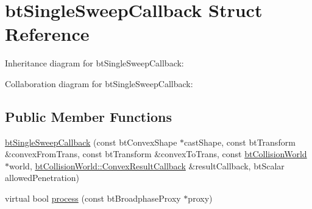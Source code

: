 \hypertarget{structbt_single_sweep_callback}{\section{bt\+Single\+Sweep\+Callback Struct Reference}
\label{structbt_single_sweep_callback}
}


Inheritance diagram for bt\+Single\+Sweep\+Callback\+:


Collaboration diagram for bt\+Single\+Sweep\+Callback\+:
\subsection*{Public Member Functions}
\begin{DoxyCompactItemize}
\item 
\hyperlink{structbt_single_sweep_callback_adb99242209085f3562005a5a0c088793}{bt\+Single\+Sweep\+Callback} (const bt\+Convex\+Shape $\ast$cast\+Shape, const bt\+Transform \&convex\+From\+Trans, const bt\+Transform \&convex\+To\+Trans, const \hyperlink{classbt_collision_world}{bt\+Collision\+World} $\ast$world, \hyperlink{structbt_collision_world_1_1_convex_result_callback}{bt\+Collision\+World\+::\+Convex\+Result\+Callback} \&result\+Callback, bt\+Scalar allowed\+Penetration)
\item 
virtual bool \hyperlink{structbt_single_sweep_callback_a38b90d239e96c18b3843435976b598fc}{process} (const bt\+Broadphase\+Proxy $\ast$proxy)
\end{DoxyCompactItemize}

